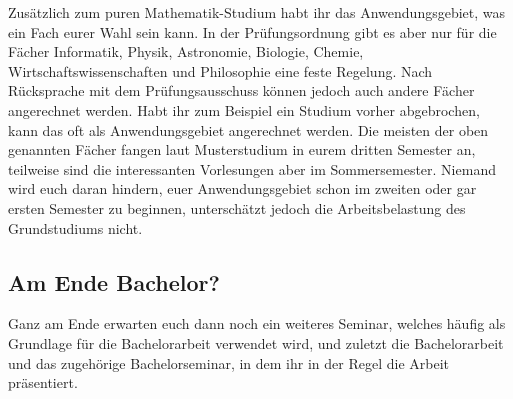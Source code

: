 Zusätzlich zum puren Mathematik-Studium habt ihr das Anwendungsgebiet, was ein Fach eurer Wahl sein kann. In der Prüfungsordnung gibt es aber nur für die Fächer Informatik, Physik, Astronomie, Biologie, Chemie, Wirtschaftswissenschaften und Philosophie eine feste Regelung. Nach Rücksprache mit dem Prüfungsausschuss können jedoch auch andere Fächer angerechnet werden. Habt ihr zum Beispiel ein Studium vorher abgebrochen, kann das oft als Anwendungsgebiet angerechnet werden. Die meisten der oben genannten Fächer fangen laut Musterstudium in eurem dritten Semester an, teilweise sind die  interessanten Vorlesungen  aber im Sommersemester. Niemand wird euch daran hindern, euer Anwendungsgebiet schon im zweiten oder gar ersten Semester zu beginnen, unterschätzt jedoch die Arbeitsbelastung des Grundstudiums nicht.

\subsection{Am Ende Bachelor?}

Ganz am Ende erwarten euch dann noch ein weiteres Seminar, welches häufig als Grundlage für die Bachelorarbeit verwendet wird, und zuletzt die Bachelorarbeit und das zugehörige Bachelorseminar, in dem ihr in der Regel die Arbeit präsentiert.
